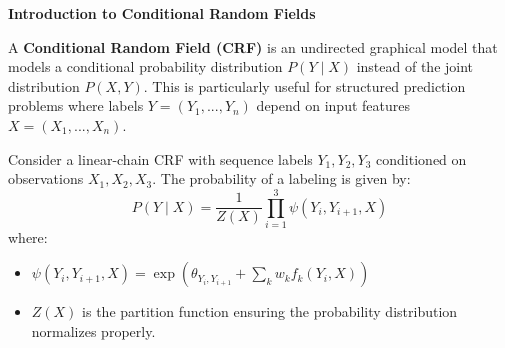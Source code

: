 \documentclass[12pt,letterpaper, onecolumn]{exam}
\begin{document}
\begin{questions}

\begin{solution}
    \begin{parts}
        \part 
        \part 
        \part
        \part
        \part
    \end{parts}
\end{solution}




\question[20 points] \textbf{Introduction to Conditional Random Fields} \droppoints  

A \textbf{Conditional Random Field (CRF)} is an undirected graphical model that models a conditional probability distribution \( P(Y \mid X) \) instead of the joint distribution \( P(X, Y) \). This is particularly useful for structured prediction problems where labels \( Y = (Y_1, ..., Y_n) \) depend on input features \( X = (X_1, ..., X_n) \).  

Consider a linear-chain CRF with sequence labels \( Y_1, Y_2, Y_3 \) conditioned on observations \( X_1, X_2, X_3 \). The probability of a labeling is given by:
\[
P(Y \mid X) = \frac{1}{Z(X)} \prod_{i=1}^{3} \psi(Y_i, Y_{i+1}, X)
\]
where:
\begin{itemize}
    \item \( \psi(Y_i, Y_{i+1}, X) = \exp(\theta_{Y_i, Y_{i+1}} + \sum_k w_k f_k(Y_i, X)) \)
    \item \( Z(X) \) is the partition function ensuring the probability distribution normalizes properly.
\end{itemize}


\end{questions}
\end{document}
